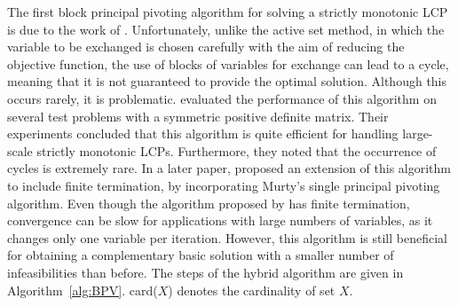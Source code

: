 \documentclass[11pt]{article}
\newcommand{\0}{\phantom{0}}
\begin{document}
The first block principal pivoting algorithm for solving a strictly monotonic LCP is due to the work of \citet{Kost1978}. Unfortunately, unlike the active set method, in which the variable to be exchanged is chosen carefully with the aim of reducing the objective function, the use of blocks of variables for exchange can lead to a cycle, meaning that it is not guaranteed to provide the optimal solution. Although this occurs rarely, it is problematic. \citet{Judice1989} evaluated the performance of this algorithm on several test problems with a symmetric positive definite matrix. Their experiments concluded that this algorithm is quite efficient for handling large-scale strictly monotonic LCPs. Furthermore, they noted that the occurrence of cycles is extremely rare. In a later paper, \citet{Judice1994} proposed an extension of this algorithm to include finite termination, by incorporating Murty's single principal pivoting algorithm. Even though the algorithm proposed by \citet{Murty1974} has finite termination, convergence can be slow for applications with large numbers of variables, as it changes only one variable per iteration. However, this algorithm is still beneficial for obtaining a complementary basic solution with a smaller number of infeasibilities than before. The steps of the hybrid algorithm are given in Algorithm~\ref{alg:BPV}. card($X$) denotes the cardinality of set $X$.
\end{document}
